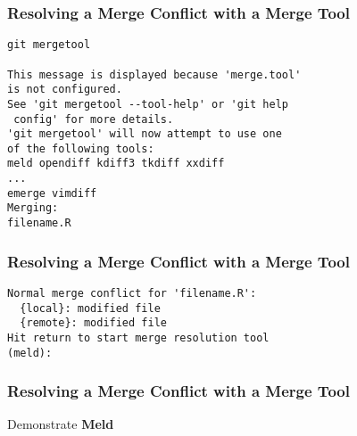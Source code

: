 \documentclass[xcolor=dvipsnames]{beamer}
\begin{document}
\begin{frame}[fragile]
\frametitle{Resolving a Merge Conflict with a Merge Tool}
\begin{block}{}
\begin{lstlisting}
git mergetool

This message is displayed because 'merge.tool' 
is not configured.
See 'git mergetool --tool-help' or 'git help
 config' for more details.
'git mergetool' will now attempt to use one
of the following tools:
meld opendiff kdiff3 tkdiff xxdiff 
...
emerge vimdiff
Merging:
filename.R
\end{lstlisting}
\end{block}
\end{frame}

\begin{frame}[fragile]
\frametitle{Resolving a Merge Conflict with a Merge Tool}
\begin{block}{}
\begin{lstlisting}
Normal merge conflict for 'filename.R':
  {local}: modified file
  {remote}: modified file
Hit return to start merge resolution tool
(meld): 
\end{lstlisting}
\end{block}
\end{frame}

\begin{frame}[fragile]
\frametitle{Resolving a Merge Conflict with a Merge Tool}

Demonstrate \textbf{Meld}

\end{frame}


\end{document}
